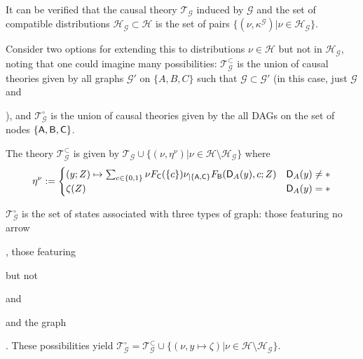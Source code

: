 \begin{example}
It can be verified that the causal theory $\mathscr{T}_{\mathcal{G}}$ induced by $\mathcal{G}$ and the set of compatible distributions $\mathscr{H}_\mathcal{G}\subset\mathscr{H}$ is the set of pairs $\{(\nu,\kappa^{\mathcal{G}} )|\nu\in \mathscr{H}_{\mathcal{G}}\}$.

Consider two options for extending this to distributions $\nu\in \mathscr{H}$ but not in $\mathscr{H}_{\mathcal{G}}$, noting that one could imagine many possibilities: $\mathscr{T}_{\mathcal{G}}^\subset$ is the union of causal theories given by all graphs $\mathcal{G}'$ on $\{A, B, C\}$ such that $\mathcal{G}\subset \mathcal{G}'$ (in this case, just $\mathcal{G}$ and ), and  $\mathscr{T}_{\mathcal{G}}^\circ$ is the union of causal theories given by the all DAGs on the set of nodes $\{\mathsf{A}, \mathsf{B}, \mathsf{C}\}$.

The theory $\mathscr{T}_{\mathcal{G}}^\subset$ is given by $\mathscr{T}_{\mathcal{G}}\cup\{(\nu,\eta^\nu )|\nu \in \mathscr{H}\setminus\mathscr{H}_\mathcal{G}\}$ where 
\begin{align}
    \eta^\nu:=\begin{cases}(y;Z)\mapsto \sum_{c\in\{0,1\}} \nu F_{\mathsf{C}}(\{c\}) \nu_{|\{\mathsf{A},\mathsf{C}\}} F_{\mathsf{B}}(\mathsf{D}_A(y),c;Z) &\mathsf{D}_A(y)\neq *\\
    \zeta(Z) &\mathsf{D}_A(y)=*\end{cases}
\end{align}

$\mathscr{T}_{\mathcal{G}}^\circ$ is the set of states associated with three types of graph: those featuring no arrow , those featuring  but not  and  and the graph . These possibilities yield $\mathscr{T}_{\mathcal{G}}^\circ=\mathscr{T}_{\mathcal{G}}^\subset\cup\{(\nu,y\mapsto \zeta)|\nu \in \mathscr{H}\setminus\mathscr{H}_\mathcal{G}\}$.


\end{example}
